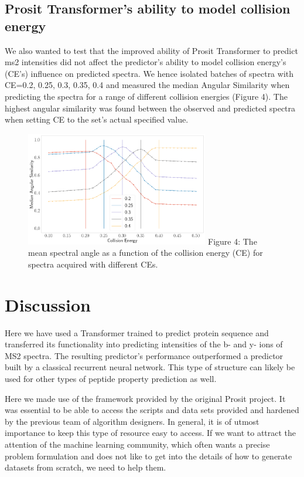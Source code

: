 \documentclass[10pt,a4paper]{article}
\begin{document}
\subsection*{Prosit Transformer’s ability to model collision energy}

We also wanted to test that the improved ability of Prosit Transformer to predict ms2 intensities did not affect the predictor’s ability to model collision energy’s (CE’s) influence on predicted spectra. We hence isolated batches of spectra with CE={0.2, 0.25, 0.3, 0.35, 0.4} and measured the median Angular Similarity when predicting the spectra for a range of different collision energies (Figure 4). The highest angular similarity was found between the observed and predicted spectra when setting CE to the set’s actual specified value.




\begin{figure}
\includegraphics[width=8cm]{./figures/CeCalibration.png}
Figure 4: The mean spectral angle as a function of the collision energy (CE) for spectra acquired with different CEs. 
\end{figure}
 
\section*{Discussion}
Here we have used a Transformer trained to predict protein sequence and transferred its functionality into predicting intensities of the b- and y- ions of MS2 spectra. The resulting predictor’s performance outperformed a predictor built by a classical recurrent neural network. This type of structure can likely be used for other types of peptide property prediction as well.

Here we made use of the framework provided by the original Prosit project. It was essential to be able to access the scripts and data sets provided and hardened by the previous team of algorithm designers. In general, it is of utmost importance to keep this type of resource easy to access. If we want to attract the attention of the machine learning community, which often wants a precise problem formulation and does not like to get into the details of how to generate datasets from scratch, we need to help them.
\end{document}
